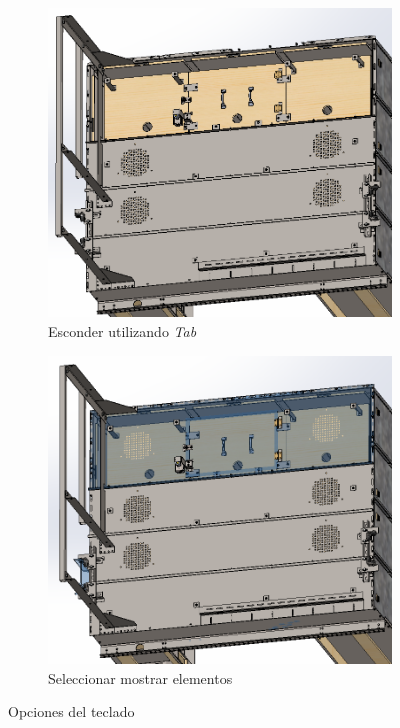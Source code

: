 \documentclass{report}
\begin{document}
\begin{figure}[H]
	\centering
	\begin{subfigure}[b]{0.45\textwidth}
		\includegraphics[width=\textwidth]{Imagenes/solidworks_quickhide_01}
		\caption{Esconder utilizando \emph{Tab}}
		\label{fig:solidworksquickhide01}
	\end{subfigure}
	\begin{subfigure}[b]{0.45\textwidth}
		\includegraphics[width=\textwidth]{Imagenes/solidworks_quickhide_02}
		\caption{Seleccionar mostrar elementos}
		\label{fig:solidworksquickhide02}
	\end{subfigure}
	\caption{Opciones del teclado}
\end{figure}
\end{document}
